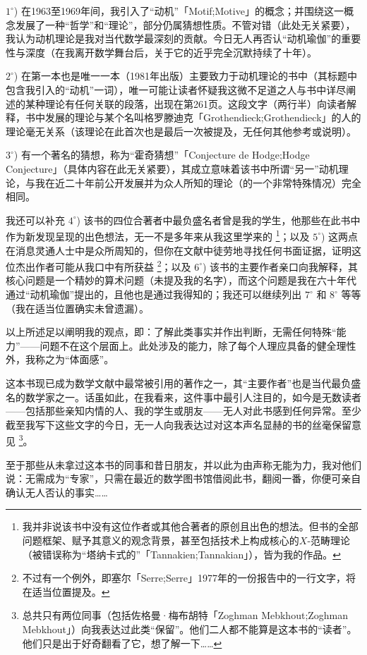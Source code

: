 $1^{\circ}$) 在1963至1969年间，我引入了“动机”「Motif;Motive」的概念；并围绕这一概念发展了一种“哲学”和“理论”，部分仍属猜想性质。不管对错（此处无关紧要），我认为动机理论是我对当代数学最深刻的贡献。今日无人再否认“动机瑜伽”的重要性与深度（在我离开数学舞台后，关于它的近乎完全沉默持续了十年）。

$2^{\circ}$) 在第一本也是唯一一本（1981年出版）主要致力于动机理论的书中（其标题中包含我引入的“动机”一词），唯一可能让读者怀疑我这微不足道之人与书中详尽阐述的某种理论有任何关联的段落，出现在第261页。这段文字（两行半）向读者解释，书中发展的理论与某个名叫格罗滕迪克「Grothendieck;Grothendieck」的人的理论毫无关系（该理论在此首次也是最后一次被提及，无任何其他参考或说明）。

$3^{\circ}$) 有一个著名的猜想，称为“霍奇猜想”「Conjecture de Hodge;Hodge Conjecture」（具体内容在此无关紧要），其成立意味着该书中所谓“另一”动机理论，与我在近二十年前公开发展并为众人所知的理论（的一个非常特殊情况）完全相同。

我还可以补充 $4^{\circ}$) 该书的四位合著者中最负盛名者曾是我的学生，他那些在此书中作为新发现呈现的出色想法，无一不是多年来从我这里学来的 \footnote{我并非说该书中没有这位作者或其他合著者的原创且出色的想法。但书的全部问题框架、赋予其意义的观念背景，甚至包括技术上构成核心的$X$-范畴理论（被错误称为“塔纳卡式的”「Tannakien;Tannakian」），皆为我的作品。}；以及 $5^{\circ}$) 这两点在消息灵通人士中是众所周知的，但你在文献中徒劳地寻找任何书面证据，证明这位杰出作者可能从我口中有所获益 \footnote{不过有一个例外，即塞尔「Serre;Serre」1977年的一份报告中的一行文字，将在适当位置提及。}；以及 $6^{\circ}$) 该书的主要作者亲口向我解释，其核心问题是一个精妙的算术问题（未提及我的名字），而这个问题是我在六十年代通过“动机瑜伽”提出的，且他也是通过我得知的；我还可以继续列出 $7^{\circ}$ 和 $8^{\circ}$ 等等（我在适当位置确实未曾遗漏）。

以上所述足以阐明我的观点，即：了解此类事实并作出判断，无需任何特殊“能力”——问题不在这个层面上。此处涉及的能力，除了每个人理应具备的健全理性外，我称之为“体面感”。

这本书现已成为数学文献中最常被引用的著作之一，其“主要作者”也是当代最负盛名的数学家之一。话虽如此，在我看来，这件事中最引人注目的，如今是无数读者——包括那些亲知内情的人、我的学生或朋友——无人对此书感到任何异常。至少截至我写下这些文字的今日，无一人向我表达过对这本声名显赫的书的丝毫保留意见 \footnote{总共只有两位同事（包括佐格曼·梅布胡特「Zoghman Mebkhout;Zoghman Mebkhout」）向我表达过此类“保留”。他们二人都不能算是这本书的“读者”。他们只是出于好奇翻看了它，想了解一下……}。

至于那些从未拿过这本书的同事和昔日朋友，并以此为由声称无能为力，我对他们说：无需成为“专家”，只需在最近的数学图书馆借阅此书，翻阅一番，你便可亲自确认无人否认的事实……